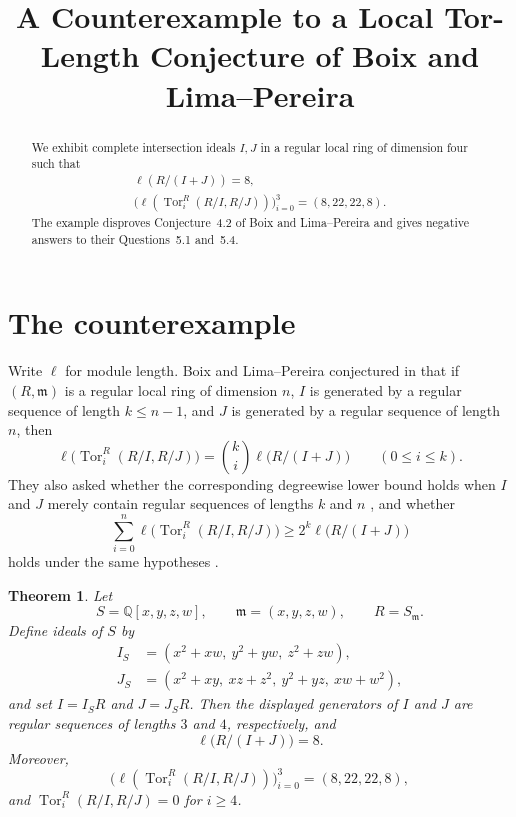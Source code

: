 \documentclass[11pt]{amsart}
\title[Local Tor-length counterexample]
{A Counterexample to a Local Tor-Length Conjecture of Boix and Lima--Pereira}
\date{}
\newtheorem{theorem}{Theorem}
\begin{document}
\begin{abstract}
We exhibit complete intersection ideals $I,J$ in a regular local ring of
dimension four such that
\[
\begin{gathered}
\ell(R/(I+J))=8,\\
\bigl(\ell(\operatorname{Tor}_i^R(R/I,R/J))\bigr)_{i=0}^3
=(8,22,22,8).
\end{gathered}
\]
The example disproves Conjecture~4.2 of Boix and Lima--Pereira and gives
negative answers to their Questions~5.1 and~5.4.
\end{abstract}

\maketitle

\section{The counterexample}

Write $\ell$ for module length. Boix and Lima--Pereira conjectured in
\cite[Conjecture~4.2]{BLP} that if
$(R,\mathfrak m)$ is a regular local ring of dimension $n$, $I$ is
generated by a regular sequence of length $k\leq n-1$, and $J$ is
generated by a regular sequence of length $n$, then
\begin{equation}\label{eq:conjecture}
\ell\bigl(\operatorname{Tor}_i^R(R/I,R/J)\bigr)
=
\binom{k}{i}\ell\bigl(R/(I+J)\bigr)
\qquad (0\leq i\leq k).
\end{equation}
They also asked whether the corresponding degreewise lower bound holds
when $I$ and $J$ merely contain regular sequences of lengths $k$ and $n$
\cite[Question~5.1]{BLP}, and whether
\begin{equation}\label{eq:total}
\sum_{i=0}^{n}\ell\bigl(\operatorname{Tor}_i^R(R/I,R/J)\bigr)
\geq 2^k\ell\bigl(R/(I+J)\bigr)
\end{equation}
holds under the same hypotheses \cite[Question~5.4]{BLP}.

\begin{theorem}\label{thm:main}
Let
\[
S=\mathbb Q[x,y,z,w],
\qquad
\mathfrak m=(x,y,z,w),
\qquad
R=S_{\mathfrak m}.
\]
Define ideals of $S$ by
\begin{align*}
I_S&=(x^2+xw,\ y^2+yw,\ z^2+zw),\\
J_S&=(x^2+xy,\ xz+z^2,\ y^2+yz,\ xw+w^2),
\end{align*}
and set $I=I_SR$ and $J=J_SR$. Then the displayed generators of $I$ and
$J$ are regular sequences of lengths $3$ and $4$, respectively, and
\[
\ell\bigl(R/(I+J)\bigr)=8.
\]
Moreover,
\[
\bigl(\ell(\operatorname{Tor}_i^R(R/I,R/J))\bigr)_{i=0}^3
=(8,22,22,8),
\]
and $\operatorname{Tor}_i^R(R/I,R/J)=0$ for $i\geq4$.
\end{theorem}
\end{document}

